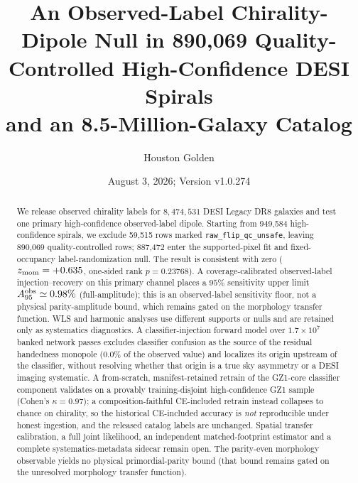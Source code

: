 \documentclass[twocolumn,linenumbers]{aastex702}
\newcommand{\paperVersion}{v1.0.274}
\newcommand{\paperTimestamp}{August 3, 2026}
\begin{document}
\raggedbottom

\title{An Observed-Label Chirality-Dipole Null in 890,069 Quality-Controlled High-Confidence DESI Spirals\\
and an 8.5-Million-Galaxy Catalog}

\author{Houston Golden}

\date{\paperTimestamp; Version \paperVersion}

\begin{abstract}
We release observed chirality labels for $8{,}474{,}531$ DESI Legacy DR8 galaxies and test one primary high-confidence observed-label dipole. Starting from 949,584 high-confidence spirals, we exclude 59,515 rows marked \texttt{raw\_flip\_qc\_unsafe}, leaving 890,069 quality-controlled rows; 887,472 enter the supported-pixel fit and fixed-occupancy label-randomization null. The result is consistent with zero ($z_{\rm mom}=+0.635$, one-sided rank $p=0.23768$). A coverage-calibrated observed-label injection--recovery on this primary channel places a $95\%$ sensitivity upper limit $A_{95}^{\rm obs}\simeq0.98\%$ (full-amplitude); this is an observed-label sensitivity floor, not a physical parity-amplitude bound, which remains gated on the morphology transfer function. WLS and harmonic analyses use different supports or nulls and are retained only as systematics diagnostics. A classifier-injection forward model over $1.7\times10^{7}$ banked network passes excludes classifier confusion as the source of the residual handedness monopole ($0.0\%$ of the observed value) and localizes its origin upstream of the classifier, without resolving whether that origin is a true sky asymmetry or a DESI imaging systematic. A from-scratch, manifest-retained retrain of the GZ1-core classifier component validates on a provably training-disjoint high-confidence GZ1 sample (Cohen's $\kappa=0.97$); a composition-faithful CE-included retrain instead collapses to chance on chirality, so the historical CE-included accuracy is \emph{not} reproducible under honest ingestion, and the released catalog labels are unchanged. Spatial transfer calibration, a full joint likelihood, an independent matched-footprint estimator and a complete systematics-metadata sidecar remain open. The parity-even morphology observable yields no physical primordial-parity bound (that bound remains gated on the unresolved morphology transfer function).
\end{abstract}
\end{document}
